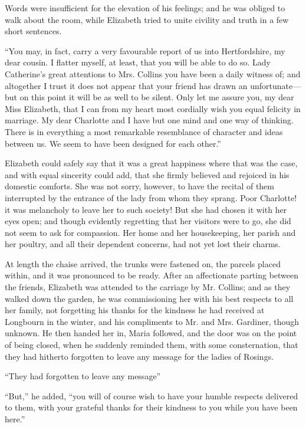 \documentclass[12pt,openright]{book}
\begin{document}
Words were insufficient for the elevation of his feelings; and he was obliged to walk about the room, while Elizabeth tried to unite civility and truth in a few short sentences.

“You may, in fact, carry a very favourable report of us into Hertfordshire, my dear cousin. I flatter myself, at least, that you will be able to do so. Lady Catherine’s great attentions to Mrs. Collins you have been a daily witness of; and altogether I trust it does not appear that your friend has drawn an unfortunate—but on this point it will be as well to be silent. Only let me assure you, my dear Miss Elizabeth, that I can from my heart most cordially wish you equal felicity in marriage. My dear Charlotte and I have but one mind and one way of thinking. There is in everything a most remarkable resemblance of character and ideas between us. We seem to have been designed for each other.”

Elizabeth could safely say that it was a great happiness where that was the case, and with equal sincerity could add, that she firmly believed and rejoiced in his domestic comforts. She was not sorry, however, to have the recital of them interrupted by the entrance of the lady from whom they sprang. Poor Charlotte! it was melancholy to leave her to such society! But she had chosen it with her eyes open; and though evidently regretting that her visitors were to go, she did not seem to ask for compassion. Her home and her housekeeping, her parish and her poultry, and all their dependent concerns, had not yet lost their charms.

At length the chaise arrived, the trunks were fastened on, the parcels placed within, and it was pronounced to be ready. After an affectionate parting between the friends, Elizabeth was attended to the carriage by Mr. Collins; and as they walked down the garden, he was commissioning her with his best respects to all her family, not forgetting his thanks for the kindness he had received at Longbourn in the winter, and his compliments to Mr. and Mrs. Gardiner, though unknown. He then handed her in, Maria followed, and the door was on the point of being closed, when he suddenly reminded them, with some consternation, that they had hitherto forgotten to leave any message for the ladies of Rosings.

“They had forgotten to leave any message”


“But,” he added, “you will of course wish to have your humble respects delivered to them, with your grateful thanks for their kindness to you while you have been here.”
\end{document}

